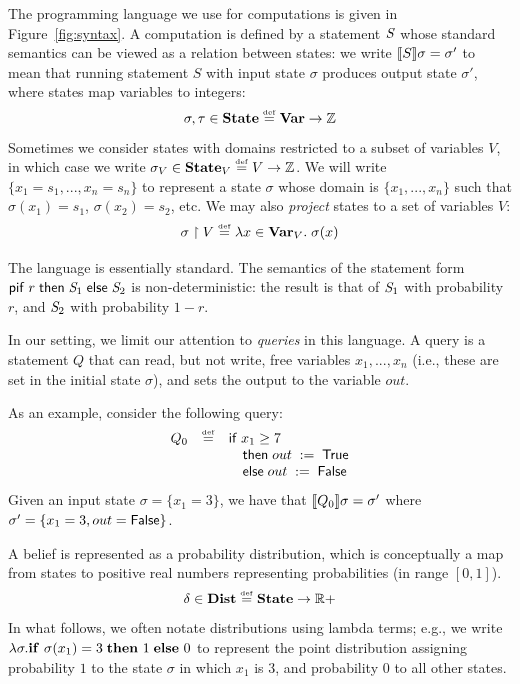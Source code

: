 \documentclass[10pt]{sigplanconf}
\begin{document}
The programming language we use for computations is given in
Figure~\ref{fig:syntax}.  A computation is defined by a statement
$\mathit{S}$ whose standard semantics can be viewed as a relation between
states: we write $[\![{S}]\!]{\sigma} = \sigma'$ to mean that running
statement $S$ with input state $\sigma$ produces output state
$\sigma'$, where states map variables to integers:
$$\begin{array}{l}
\sigma, \tau \in \textbf{State} \stackrel{\smash{\scriptscriptstyle \mathrm{def}}}= \textbf{Var} \rightarrow \mathbb{Z}
\end{array}$$
Sometimes we consider states with domains restricted to a
subset of variables $V$, in which case we write $\sigma_V \in
\textbf{State}_V \stackrel{\smash{\scriptscriptstyle \mathrm{def}}}= V \rightarrow \mathbb{Z}$.  We will write $\{ x_1 =
s_1, ..., x_n = s_n \}$ to represent a state $\sigma$ whose domain is
$\{x_1,...,x_n\}$ such that $\sigma(x_1) = s_1$, $\sigma(x_2) = s_2$, etc.
We may also \emph{project} states to a set of variables $V$:
$$ \sigma \upharpoonright V \stackrel{\smash{\scriptscriptstyle \mathrm{def}}}= \lambda x \in \textbf{Var}_V . \; \sigma(x) $$

The language is essentially standard.
The semantics of the statement form $\mathsf{pif}\;{r}\;\mathsf{then}\;{\mathit{S}_1}\;\mathsf{else}\;{\mathit{S}_2}$ is
non-deterministic: the result is that of $\mathit{S}_1$ with probability
$r$, and $\mathit{S}_2$ with probability $1 - r$.

In our setting, we limit our attention to \emph{queries} in this
language.  A query is a statement $Q$ that can read, but not write,
free variables $x_1,...,x_n$ (i.e., these are set in the initial state
$\sigma$), and sets the output to the variable $out$.
\begin{example}
As an example, consider the following query:
\label{ex:q0}
$$
\begin{array}{lcl}
Q_0 & \stackrel{\smash{\scriptscriptstyle \mathrm{def}}}=  & \mathsf{if}\; x_1 \geq 7 \\
&& \quad  \mathsf{then}\;{out}\;:=\;{\mathsf{True}} \\
&& \quad \mathsf{else}\; {out}\;:=\;{\mathsf{False}} \\
\end{array}
$$
Given an input state $\sigma = \{ x_1 = 3 \}$, we have that
$[\![{Q_0}]\!]{\sigma} = \sigma'$ where $\sigma' = \{ x_1 = 3, out =
\mathsf{False} \}$.
\end{example}

A belief is represented as a probability distribution, which is
conceptually a map from states to positive real numbers
representing probabilities (in range $[0,1]$).
$$\begin{array}{l}
\delta \in \textbf{Dist} \stackrel{\smash{\scriptscriptstyle \mathrm{def}}}= \textbf{State} \rightarrow \mathbb{R}+
\end{array}$$
In what follows, we often notate distributions using lambda terms;
e.g., we write $\lambda \sigma. \text{\textbf{if} } \sigma(x_1) = 3\; \text{\textbf{then} } 1\;
\text{\textbf{else} } 0$ to represent the point distribution assigning probability
$1$ to the state $\sigma$ in which $x_1$ is $3$, and probability $0$
to all other states.
\end{document}
